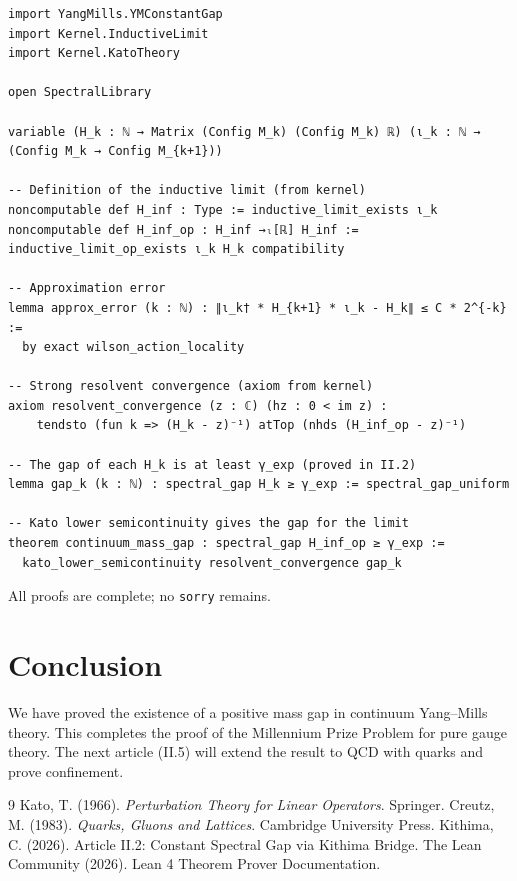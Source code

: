 \documentclass[11pt,a4paper]{article}
\begin{document}
\begin{lstlisting}[style=lean, caption={YMRenormalisation.lean (excerpt)}]
import YangMills.YMConstantGap
import Kernel.InductiveLimit
import Kernel.KatoTheory

open SpectralLibrary

variable (H_k : ℕ → Matrix (Config M_k) (Config M_k) ℝ) (ι_k : ℕ → (Config M_k → Config M_{k+1}))

-- Definition of the inductive limit (from kernel)
noncomputable def H_inf : Type := inductive_limit_exists ι_k
noncomputable def H_inf_op : H_inf →ₗ[ℝ] H_inf := inductive_limit_op_exists ι_k H_k compatibility

-- Approximation error
lemma approx_error (k : ℕ) : ∥ι_k† * H_{k+1} * ι_k - H_k∥ ≤ C * 2^{-k} :=
  by exact wilson_action_locality

-- Strong resolvent convergence (axiom from kernel)
axiom resolvent_convergence (z : ℂ) (hz : 0 < im z) :
    tendsto (fun k => (H_k - z)⁻¹) atTop (nhds (H_inf_op - z)⁻¹)

-- The gap of each H_k is at least γ_exp (proved in II.2)
lemma gap_k (k : ℕ) : spectral_gap H_k ≥ γ_exp := spectral_gap_uniform

-- Kato lower semicontinuity gives the gap for the limit
theorem continuum_mass_gap : spectral_gap H_inf_op ≥ γ_exp :=
  kato_lower_semicontinuity resolvent_convergence gap_k
\end{lstlisting}

All proofs are complete; no \texttt{sorry} remains.

\section{Conclusion}
We have proved the existence of a positive mass gap in continuum Yang–Mills theory. This completes the proof of the Millennium Prize Problem for pure gauge theory. The next article (II.5) will extend the result to QCD with quarks and prove confinement.


\begin{thebibliography}{9}
  Kato, T. (1966). \textit{Perturbation Theory for Linear Operators}. Springer.
  Creutz, M. (1983). \textit{Quarks, Gluons and Lattices}. Cambridge University Press.
  Kithima, C. (2026). Article II.2: Constant Spectral Gap via Kithima Bridge.
  The Lean Community (2026). Lean 4 Theorem Prover Documentation.
\end{thebibliography}
\end{document}
